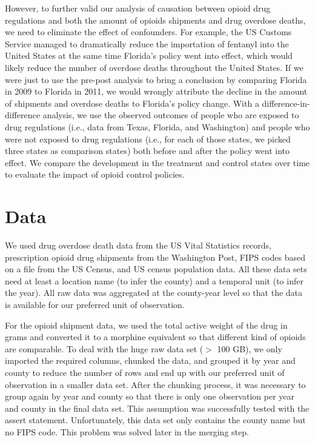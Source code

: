 \documentclass[12pt,letterpaper]{article}
\begin{document}
However, to further valid our analysis of causation between opioid drug regulations and both the amount of opioids shipments and drug overdose deaths, we need to eliminate the effect of confounders. For example, the US Customs Service managed to dramatically reduce the importation of fentanyl into the United States at the same time Florida’s policy went into effect, which would likely reduce the number of overdose deaths throughout the United States. If we were just to use the pre-post analysis to bring a conclusion by comparing Florida in 2009 to Florida in 2011, we would wrongly attribute the decline in the amount of shipments and overdose deaths to Florida’s policy change. With a difference-in-difference analysis, we use the observed outcomes of people who are exposed to drug regulations (i.e., data from Texas, Florida, and Washington) and people who were not exposed to drug regulations (i.e., for each of those states, we picked three states as comparison states) both before and after the policy went into effect. We compare the development in the treatment and control states over time to evaluate the impact of opioid control policies.

\section{Data}
We used drug overdose death data from the US Vital Statistics records, prescription opioid drug shipments from the Washington Post, FIPS codes based on a file from the US Census, and US census population data. All these data sets need at least a location name (to infer the county) and a temporal unit (to infer the year). All raw data was aggregated at the county-year level so that the data is available for our preferred unit of observation.

For the opioid shipment data, we used the total active weight of the drug in grams and converted it to a morphine equivalent so that different kind of opioids are comparable. To deal with the huge raw data set ($>$ 100 GB), we only imported the required columns, chunked the data, and grouped it by year and county to reduce the number of rows and end up with our preferred unit of observation in a smaller data set. After the chunking process, it was necessary to group again by year and county so that there is only one observation per year and county in the final data set. This assumption was successfully tested with the assert statement. Unfortunately, this data set only contains the county name but no FIPS code. This problem was solved later in the merging step.
\end{document}
